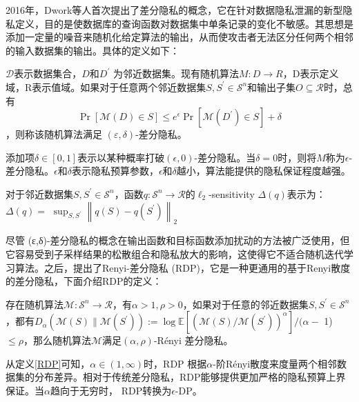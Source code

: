 2016年，Dwork等人首次提出了差分隐私的概念，它在针对数据隐私泄漏的新型隐私定义，目的是使数据库的查询函数对数据集中单条记录的变化不敏感。其思想是添加一定量的噪音来随机化给定算法的输出，从而使攻击者无法区分任何两个相邻的输入数据集的输出。具体的定义如下：
\begin{define}[(ε,δ)-DP]\label{(ε,δ)-DP}
$\mathcal{D}$表示数据集合，$D$和$D^{\prime}$ 为邻近数据集。现有随机算法$M: D \rightarrow R$，D表示定义域，R表示值域。如果对于任意两个邻近数据集$S, S^{\prime} \in \mathcal{S}^{n}$和输出子集$O \subseteq \mathcal{R}$时，总有$$
\operatorname{Pr}[\mathcal{M}(D) \in S] \leq e^{\epsilon} \operatorname{Pr}\left[\mathcal{M}\left(D^{\prime}\right) \in S\right]+\delta
$$，则称该随机算法满足 $(\varepsilon, \delta)$-差分隐私。
\end{define}
添加项$\delta \in[0,1]$表示以某种概率打破$(\epsilon, 0)$-差分隐私。当$\delta=0$时，则将$M$称为$\epsilon$-差分隐私。$\epsilon$和$\delta$表示隐私预算参数，$\epsilon$和$\delta$越小，算法能提供的隐私保证程度越强。

\begin{define}[l2敏感度]\label{l2-sensitivity}
对于邻近数据集$S, S^{\prime} \in \mathcal{S}^{n}$，函数$q: \mathcal{S}^{n} \rightarrow \mathcal{R}$的$\ell_{2}$-sensitivity $\Delta(q)$表示为：$\Delta(q)=$ $\sup _{S, S^{\prime}}\left\|q(S)-q\left(S^{\prime}\right)\right\|_{2}$
\end{define}

尽管 (ε,δ)-差分隐私的概念在输出函数和目标函数添加扰动的方法被广泛使用，但它容易受到子采样结果的松散组合和隐私放大的影响，这使得它不适合随机迭代学习算法。之后，提出了Renyi-差分隐私 (RDP)，它是一种更通用的基于Renyi散度的差分隐私，下面介绍RDP的定义：

\begin{define}[RDP]\label{RDP}
存在随机算法$\mathcal{M}: \mathcal{S}^{n} \rightarrow \mathcal{R}$，有$\alpha>1, \rho>0$，如果对于任意的邻近数据集$S, S^{\prime} \in \mathcal{S}^{n}$，都有$D_{\alpha}\left(\mathcal{M}(S) \| \mathcal{M}\left(S^{\prime}\right)\right):=\log \mathbb{E}\left[\left(\mathcal{M}(S) / \mathcal{M}\left(S^{\prime}\right)\right)^{\alpha}\right] /(\alpha-$ 1) $\leq \rho$，那么随机算法$\mathcal{M}$满足$(\alpha, \rho)$-Rényi 差分隐私。
\end{define}

从定义\ref{RDP}可知，$\alpha \in(1, \infty)$时，RDP 根据$\alpha$-阶Rényi散度来度量两个相邻数据集的分布差异。相对于传统差分隐私，RDP能够提供更加严格的隐私预算上界保证。当$\alpha$趋向于无穷时， RDP转换为$\epsilon$-DP。

